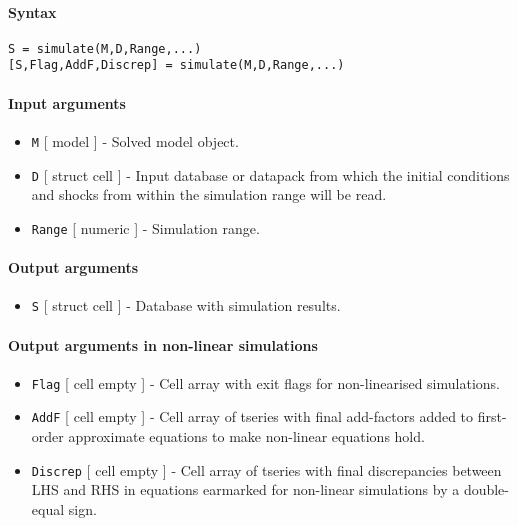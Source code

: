 


	\paragraph{Syntax}

\begin{verbatim}
S = simulate(M,D,Range,...)
[S,Flag,AddF,Discrep] = simulate(M,D,Range,...)
\end{verbatim}

\paragraph{Input arguments}

\begin{itemize}
\item
  \texttt{M} {[} model {]} - Solved model object.
\item
  \texttt{D} {[} struct \textbar{} cell {]} - Input database or datapack
  from which the initial conditions and shocks from within the
  simulation range will be read.
\item
  \texttt{Range} {[} numeric {]} - Simulation range.
\end{itemize}

\paragraph{Output arguments}

\begin{itemize}
\itemsep1pt\parskip0pt
\item
  \texttt{S} {[} struct \textbar{} cell {]} - Database with simulation
  results.
\end{itemize}

\paragraph{Output arguments in non-linear
simulations}

\begin{itemize}
\item
  \texttt{Flag} {[} cell \textbar{} empty {]} - Cell array with exit
  flags for non-linearised simulations.
\item
  \texttt{AddF} {[} cell \textbar{} empty {]} - Cell array of tseries
  with final add-factors added to first-order approximate equations to
  make non-linear equations hold.
\item
  \texttt{Discrep} {[} cell \textbar{} empty {]} - Cell array of tseries
  with final discrepancies between LHS and RHS in equations earmarked
  for non-linear simulations by a double-equal sign.
\end{itemize}

